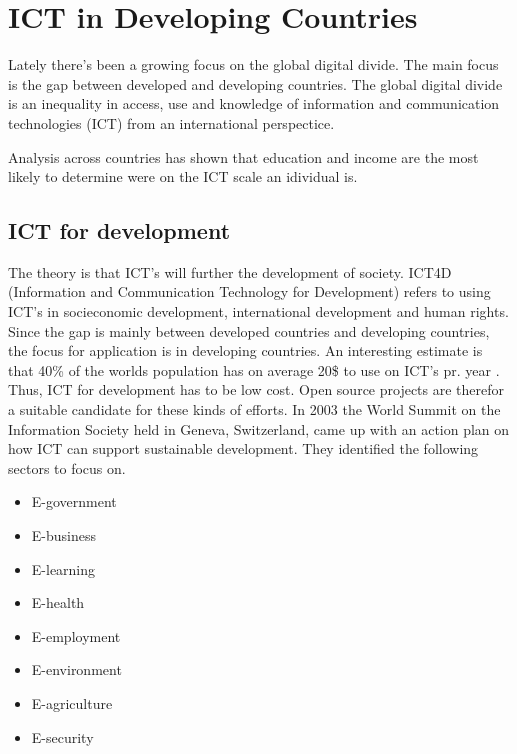 \chapter{ICT in Developing Countries}
\label{ict_in_dev}
Lately there's been a growing focus on the global digital divide.
The main focus is the gap between developed and developing countries.
The global digital divide is an inequality in access, use and knowledge of information and communication technologies (ICT) from an international perspectice.

Analysis across countries has shown that education and income are the most likely to determine were on the ICT scale an idividual is\cite{21}.

\section{ICT for development}
The theory is that ICT's will further the development of society. 
ICT4D (Information and Communication Technology for Development)  refers to using ICT's in socieconomic development, international development and human rights.
Since the gap is mainly between developed countries and developing countries, the focus for application is in developing countries.
An interesting estimate is that 40\% of the worlds population has on average 20\$ to use on ICT's pr. year \cite{22}.
Thus, ICT for development has to be low cost.
Open source projects are therefor a suitable candidate for these kinds of efforts.
In 2003 the World Summit on the Information Society held in Geneva, Switzerland, came up with an action plan on how ICT can support sustainable development.
They identified the following sectors to focus on.
\begin{itemize}
\item E-government
\item E-business
\item E-learning
\item E-health
\item E-employment
\item E-environment
\item E-agriculture
\item E-security
\end{itemize}\cite{22}
